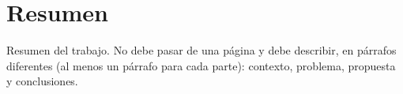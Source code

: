 \section*{Resumen} 
\label{sec:abstract}

\begin{shaded}
Resumen del trabajo. No debe pasar de una página y debe describir, en párrafos diferentes (al menos un párrafo para cada parte): contexto, problema, propuesta y conclusiones.
\end{shaded}